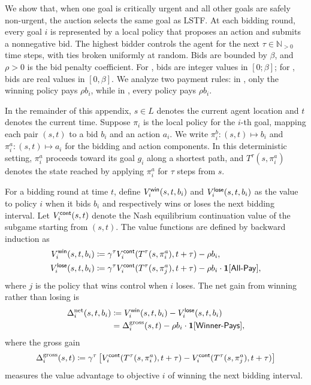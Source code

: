 We show that, when one goal is critically urgent and all other goals are safely non-urgent, the auction selects the same goal as LSTF.
At each bidding round, every goal \(i\) is represented by a local policy that proposes an action and submits a nonnegative bid.
The highest bidder controls the agent for the next \(\tau\in\mathbb{N}_{>0}\) time steps, with ties broken uniformly at random.
Bids are bounded by \(\beta\), and \(\rho>0\) is the bid penalty coefficient.
For \poorman, bids are integer values in \([0;\beta]\); for \allpay, bids are real values in \([0,\beta]\).
We analyze two payment rules: in \poorman, only the winning policy pays \(\rho b_i\), while in \allpay, every policy pays \(\rho b_i\).

In the remainder of this appendix, \(s\in L\) denotes the current agent location and \(t\) denotes the current time.
Suppose \(\pi_i\) is the local policy for the \(i\)-th goal, mapping each pair \((s,t)\) to a bid \(b_i\) and an action \(a_i\).
We write \(\pi_i^b\colon (s,t)\mapsto b_i\) and \(\pi_i^a\colon (s,t)\mapsto a_i\) for the bidding and action components.
In this deterministic setting, \(\pi_i^a\) proceeds toward its goal \(g_i\) along a shortest path, and \(T^\tau(s,\pi_i^a)\) denotes the state reached by applying \(\pi_i^a\) for \(\tau\) steps from \(s\).

For a bidding round at time \(t\), define \(V_i^{\mathsf{win}}(s,t,b_i)\) and \(V_i^{\mathsf{lose}}(s,t,b_i)\) as the value to policy \(i\) when it bids \(b_i\) and respectively wins or loses the next bidding interval.
Let \(V_i^{\mathsf{cont}}(s,t)\) denote the Nash equilibrium continuation value of the subgame starting from \((s,t)\).
The value functions are defined by backward induction as
\begin{align*}
  V_i^{\mathsf{win}}(s,t,b_i)
  &\coloneqq
  \gamma^\tau V_i^{\mathsf{cont}}(T^\tau(s,\pi_i^a),t+\tau)-\rho b_i,\\
  V_i^{\mathsf{lose}}(s,t,b_i)
  &\coloneqq
  \gamma^\tau V_i^{\mathsf{cont}}(T^\tau(s,\pi_j^a),t+\tau)-\rho b_i\cdot \mathbf{1}[\text{\textsf{All-Pay}}],
\end{align*}
where \(j\) is the policy that wins control when \(i\) loses.
The net gain from winning rather than losing is
\begin{align*}
  \Delta_i^{\mathrm{net}}(s,t,b_i)
  &\coloneqq
  V_i^{\mathsf{win}}(s,t,b_i)-V_i^{\mathsf{lose}}(s,t,b_i)\\
  &=
  \Delta_i^{\mathrm{gross}}(s,t)-\rho b_i\cdot \mathbf{1}[\text{\textsf{Winner-Pays}}],
\end{align*}
where the gross gain
\[
  \Delta_i^{\mathrm{gross}}(s,t)
  \coloneqq
  \gamma^\tau\left[
    V_i^{\mathsf{cont}}(T^\tau(s,\pi_i^a),t+\tau)
    -
    V_i^{\mathsf{cont}}(T^\tau(s,\pi_j^a),t+\tau)
  \right]
\]
measures the value advantage to objective \(i\) of winning the next bidding interval.

